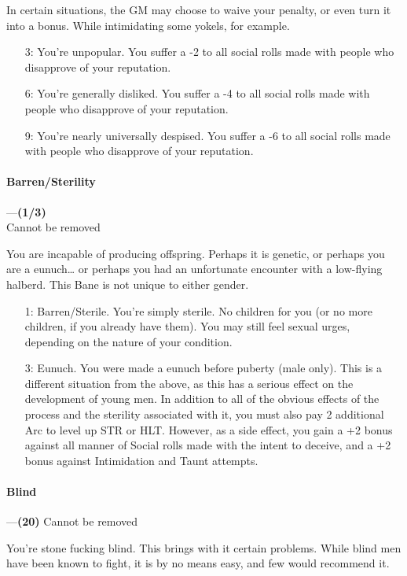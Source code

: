 \documentclass[oneside,11pt,english]{book}
\begin{document}
In certain situations, the GM may choose to waive your penalty, or even turn it into a bonus. While 
intimidating some yokels, for example. 

\begin{itemize}
	\item [3:] You're unpopular. You suffer a -2 to all social rolls made with people who disapprove of your 
	reputation. 
	\item [6:] You're generally disliked. You suffer a -4 to all social rolls made with people who disapprove of your 
	reputation. 
	\item [9:] You're nearly universally despised. You suffer a -6 to all social rolls made with people who disapprove 
of your reputation. 
\end{itemize}
\paragraph{\label{bane:Barren/Sterility}Barren/Sterility}---\quad\textbf{(1/3)}\\
{Cannot be removed}\par
You are incapable of producing offspring. Perhaps it is genetic, or perhaps you are a eunuch… or perhaps 
you had an unfortunate encounter with a low-flying halberd. This Bane is not unique to either gender. 
\begin{itemize}
\item [1:] Barren/Sterile. You’re simply sterile. No children for you (or no more children, if you already have them). You may still feel sexual urges, depending on the nature of your condition.
\item [3:] Eunuch. You were made a eunuch before puberty (male only). This is a different situation from the above, as this has a serious effect on the development of young men. In addition to all of the obvious effects of the process and the sterility associated with it, you must also pay 2 additional Arc to level up STR or HLT. However, as a side effect, you gain a +2 bonus against all manner of Social rolls made with the intent to deceive, and a +2 bonus against Intimidation and Taunt attempts.
\end{itemize}
\paragraph{\label{bane:Blind}Blind}---\quad\textbf{(20)}
{Cannot be removed}\par
You're stone fucking blind. This brings with it certain problems. While blind men have been known to fight, it is by no means easy, and few would recommend it. 
\end{document}
